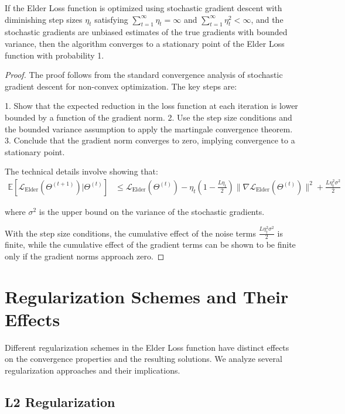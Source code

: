 \begin{theorem}
If the Elder Loss function is optimized using stochastic gradient descent with diminishing step sizes $\eta_t$ satisfying $\sum_{t=1}^{\infty} \eta_t = \infty$ and $\sum_{t=1}^{\infty} \eta_t^2 < \infty$, and the stochastic gradients are unbiased estimates of the true gradients with bounded variance, then the algorithm converges to a stationary point of the Elder Loss function with probability 1.
\end{theorem}

\begin{proof}
The proof follows from the standard convergence analysis of stochastic gradient descent for non-convex optimization. The key steps are:

1. Show that the expected reduction in the loss function at each iteration is lower bounded by a function of the gradient norm.
2. Use the step size conditions and the bounded variance assumption to apply the martingale convergence theorem.
3. Conclude that the gradient norm converges to zero, implying convergence to a stationary point.

The technical details involve showing that:
\begin{align}
\mathbb{E}[\mathcal{L}_{\text{Elder}}(\Theta^{(t+1)}) | \Theta^{(t)}] &\leq \mathcal{L}_{\text{Elder}}(\Theta^{(t)}) - \eta_t(1 - \frac{L\eta_t}{2})\|\nabla \mathcal{L}_{\text{Elder}}(\Theta^{(t)})\|^2 + \frac{L\eta_t^2\sigma^2}{2}
\end{align}

where $\sigma^2$ is the upper bound on the variance of the stochastic gradients.

With the step size conditions, the cumulative effect of the noise terms $\frac{L\eta_t^2\sigma^2}{2}$ is finite, while the cumulative effect of the gradient terms can be shown to be finite only if the gradient norms approach zero.
\end{proof}

\section{Regularization Schemes and Their Effects}

Different regularization schemes in the Elder Loss function have distinct effects on the convergence properties and the resulting solutions. We analyze several regularization approaches and their implications.

\subsection{L2 Regularization}

